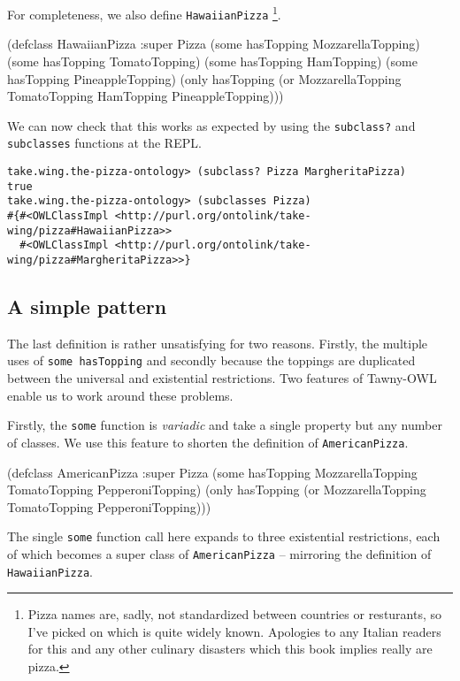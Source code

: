 \documentclass[11pt]{article}
\begin{document}
For completeness, we also define \verb~HawaiianPizza~ \footnote{Pizza names are, sadly,
not standardized between countries or resturants, so I've picked on which is
quite widely known. Apologies to any Italian readers for this and any other
culinary disasters which this book implies really are pizza.}.

\begin{tawny}
(defclass HawaiianPizza
  :super
  Pizza
  (some hasTopping MozzarellaTopping)
  (some hasTopping TomatoTopping)
  (some hasTopping HamTopping)
  (some hasTopping PineappleTopping)
  (only hasTopping
	(or MozzarellaTopping TomatoTopping HamTopping PineappleTopping)))
\end{tawny}

We can now check that this works as expected by using the \verb~subclass?~ and
\verb~subclasses~ functions at the REPL.

\begin{verbatim}
take.wing.the-pizza-ontology> (subclass? Pizza MargheritaPizza)
true
take.wing.the-pizza-ontology> (subclasses Pizza)
#{#<OWLClassImpl <http://purl.org/ontolink/take-wing/pizza#HawaiianPizza>>
  #<OWLClassImpl <http://purl.org/ontolink/take-wing/pizza#MargheritaPizza>>}
\end{verbatim}

\subsection{A simple pattern}
\label{sec-5-6}

The last definition is rather unsatisfying for two reasons. Firstly, the
multiple uses of \verb~some hasTopping~ and secondly because the toppings are
duplicated between the universal and existential restrictions. Two features of
Tawny-OWL enable us to work around these problems. 

Firstly, the \verb~some~ function is \emph{variadic} and take a single property but any
number of classes. We use this feature to shorten the definition of
\verb~AmericanPizza~. 

\begin{tawny}
(defclass AmericanPizza
  :super
  Pizza
  (some hasTopping MozzarellaTopping
	TomatoTopping PepperoniTopping)
  (only hasTopping (or MozzarellaTopping TomatoTopping PepperoniTopping)))
\end{tawny}

The single \verb~some~ function call here expands to three existential
restrictions, each of which becomes a super class of \verb~AmericanPizza~ --
mirroring the definition of \verb~HawaiianPizza~.
\end{document}
